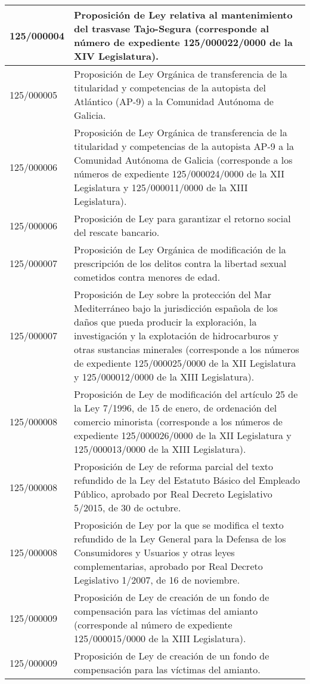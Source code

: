 {\begin{table}[H]
\begin{center}
\begin{tabularx}{\linewidth}{| l | X |}
\hline
125/000004 & Proposición de Ley relativa al mantenimiento del trasvase Tajo-Segura (corresponde al número de expediente 125/000022/0000 de la XIV Legislatura). \\
\hline
125/000005 & Proposición de Ley Orgánica de transferencia de la titularidad y competencias de la autopista del Atlántico (AP-9) a la Comunidad Autónoma de Galicia. \\
\hline
125/000006 & Proposición de Ley Orgánica de transferencia de la titularidad y competencias de la autopista AP-9 a la Comunidad Autónoma de Galicia (corresponde a los números de expediente 125/000024/0000 de la XII Legislatura y 125/000011/0000 de la XIII Legislatura). \\
\hline
125/000006 & Proposición de Ley para garantizar el retorno social del rescate bancario. \\
\hline
125/000007 & Proposición de Ley Orgánica de modificación de la prescripción de los delitos contra la libertad sexual cometidos contra menores de edad. \\
\hline
125/000007 & Proposición de Ley sobre la protección del Mar Mediterráneo bajo la jurisdicción española de los daños que pueda producir la exploración, la investigación y la explotación de hidrocarburos y otras sustancias minerales (corresponde a los números de expediente 125/000025/0000 de la XII Legislatura y 125/000012/0000 de la XIII Legislatura). \\
\hline
125/000008 & Proposición de Ley de modificación del artículo 25 de la Ley 7/1996, de 15 de enero, de ordenación del comercio minorista (corresponde a los números de expediente 125/000026/0000 de la XII Legislatura y 125/000013/0000 de la XIII Legislatura). \\
\hline
125/000008 & Proposición de Ley de reforma parcial del texto refundido de la Ley del Estatuto Básico del Empleado Público, aprobado por Real Decreto Legislativo 5/2015, de 30 de octubre. \\
\hline
125/000008 & Proposición de Ley por la que se modifica el texto refundido de la Ley General para la Defensa de los Consumidores y Usuarios y otras leyes complementarias, aprobado por Real Decreto Legislativo 1/2007, de 16 de noviembre. \\
\hline
125/000009 & Proposición de Ley de creación de un fondo de compensación para las víctimas del amianto (corresponde al número de expediente 125/000015/0000 de la XIII Legislatura). \\
\hline
125/000009 & Proposición de Ley de creación de un fondo de compensación para las víctimas del amianto. \\

\end{tabularx}
\end{center}
\end{table}}
